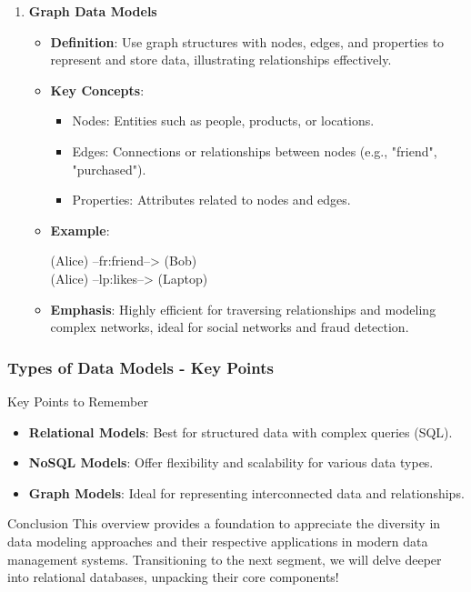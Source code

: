 \documentclass[aspectratio=169]{beamer}
\begin{document}
\begin{frame}[fragile]
\begin{enumerate}
        \item \textbf{Graph Data Models}
        \begin{itemize}
            \item \textbf{Definition}: Use graph structures with nodes, edges, and properties to represent and store data, illustrating relationships effectively.
            \item \textbf{Key Concepts}:
            \begin{itemize}
                \item Nodes: Entities such as people, products, or locations.
                \item Edges: Connections or relationships between nodes (e.g., "friend", "purchased").
                \item Properties: Attributes related to nodes and edges.
            \end{itemize}
            \item \textbf{Example}:
            \begin{center}
                (Alice) --fr:friend--> (Bob) \\ 
                (Alice) --lp:likes--> (Laptop)
            \end{center}
            \item \textbf{Emphasis}: Highly efficient for traversing relationships and modeling complex networks, ideal for social networks and fraud detection.
        \end{itemize}
    \end{enumerate}
\end{frame}

\begin{frame}[fragile]
    \frametitle{Types of Data Models - Key Points}
    \begin{block}{Key Points to Remember}
        \begin{itemize}
            \item \textbf{Relational Models}: Best for structured data with complex queries (SQL).
            \item \textbf{NoSQL Models}: Offer flexibility and scalability for various data types.
            \item \textbf{Graph Models}: Ideal for representing interconnected data and relationships.
        \end{itemize}
    \end{block}
    
    \begin{block}{Conclusion}
        This overview provides a foundation to appreciate the diversity in data modeling approaches and their respective applications in modern data management systems. Transitioning to the next segment, we will delve deeper into relational databases, unpacking their core components!
    \end{block}
\end{frame}
\end{document}
